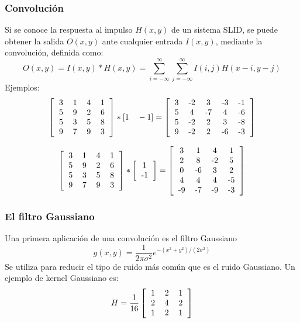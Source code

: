 \begin{frame}\frametitle{Convolución}
  Si se conoce la respuesta al impulso $H(x,y)$ de un sistema SLID, se puede obtener la salida $O(x,y)$ ante cualquier entrada $I(x,y)$, mediante la convolución, definida como:
  \[O(x,y) = I(x,y)*H(x,y) = \sum_{i=-\infty}^\infty \sum_{j=-\infty}^\infty I(i,j)H(x-i, y-j)\]
  Ejemplos:
  \[\left[\begin{tabular}{cccc}
      3 & 1 & 4 & 1\\
      5 & 9 & 2 & 6\\
      5 & 3 & 5 & 8\\
      9 & 7 & 9 &3
    \end{tabular}\right]* [1\quad -1] =
  \left[\begin{tabular}{ccccc}
      3 & -2 & 3 & -3 & -1\\
      5 & 4 & -7 & 4 & -6\\
      5 & -2 & 2 & 3 & -8\\
      9 & -2 & 2 & -6 & -3
    \end{tabular}\right]\]

  \[\left[\begin{tabular}{cccc}
      3 & 1 & 4 & 1\\
      5 & 9 & 2 & 6\\
      5 & 3 & 5 & 8\\
      9 & 7 & 9 &3
    \end{tabular}\right]* \left[\begin{tabular}{c}1 \\ -1\end{tabular}\right] =
  \left[\begin{tabular}{cccc}
      3 & 1 & 4 & 1\\
      2 & 8 & -2 & 5\\
      0 & -6 & 3 & 2\\
      4 & 4 & 4 & -5\\
      -9 & -7 & -9 & -3
    \end{tabular}\right]\]
\end{frame}

\begin{frame}\frametitle{El filtro Gaussiano}
  Una primera aplicación de una convolución es el filtro Gaussiano
  \[
    g(x,y) = \frac{1}{2\pi\sigma^2}e^{-(x^2 + y^2)/(2\sigma^2)}
  \]
  Se utiliza para reducir el tipo de ruido más común que es el ruido Gaussiano. Un ejemplo de kernel Gaussiano es:
  \[ H = \frac{1}{16}
  \left[\begin{tabular}{ccc}
      1 & 2 & 1\\
      2 & 4 & 2\\
      1 & 2 & 1
  \end{tabular}\right]
\]
\end{frame}

